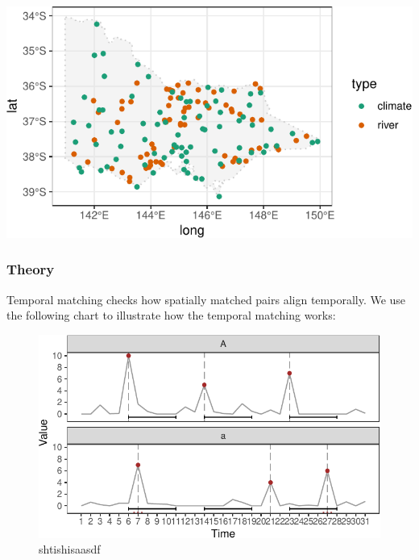 \documentclass[
]{jss}
\begin{document}
\begin{CodeChunk}


\begin{center}\includegraphics{figures/unnamed-chunk-18-1} \end{center}

\end{CodeChunk}

\hypertarget{theory}{%
\subsubsection{Theory}\label{theory}}

Temporal matching checks how spatially matched pairs align temporally.
We use the following chart to illustrate how the temporal matching
works:

\begin{CodeChunk}
\begin{figure}

{\centering \includegraphics{figures/unnamed-chunk-19-1} 

}

\caption[shtishisaasdf]{shtishisaasdf}\label{fig:unnamed-chunk-19}
\end{figure}
\end{CodeChunk}
\end{document}
